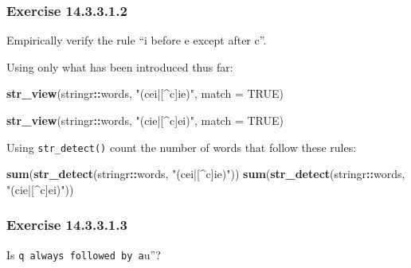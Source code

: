 \documentclass[]{book}
\newenvironment{Shaded}{\begin{snugshade}}{\end{snugshade}}
\newcommand{\DataTypeTok}[1]{\textcolor[rgb]{0.13,0.29,0.53}{#1}}
\newcommand{\KeywordTok}[1]{\textcolor[rgb]{0.13,0.29,0.53}{\textbf{#1}}}
\newcommand{\NormalTok}[1]{#1}
\newcommand{\OperatorTok}[1]{\textcolor[rgb]{0.81,0.36,0.00}{\textbf{#1}}}
\newcommand{\OtherTok}[1]{\textcolor[rgb]{0.56,0.35,0.01}{#1}}
\newcommand{\StringTok}[1]{\textcolor[rgb]{0.31,0.60,0.02}{#1}}
\theoremstyle{plain}
\theoremstyle{remark}
\begin{document}
\hypertarget{exercise-14.3.3.1.2}{%
\subsubsection*{\texorpdfstring{Exercise
{14.3.3.1.2}}{Exercise 14.3.3.1.2}}\label{exercise-14.3.3.1.2}}

Empirically verify the rule ``i before e except after c''.

Using only what has been introduced thus far:

\begin{Shaded}
\begin{Highlighting}[]
\KeywordTok{str_view}\NormalTok{(stringr}\OperatorTok{::}\NormalTok{words, }\StringTok{"(cei|[^c]ie)"}\NormalTok{, }\DataTypeTok{match =} \OtherTok{TRUE}\NormalTok{)}
\end{Highlighting}
\end{Shaded}

\begin{Shaded}
\begin{Highlighting}[]
\KeywordTok{str_view}\NormalTok{(stringr}\OperatorTok{::}\NormalTok{words, }\StringTok{"(cie|[^c]ei)"}\NormalTok{, }\DataTypeTok{match =} \OtherTok{TRUE}\NormalTok{)}
\end{Highlighting}
\end{Shaded}

Using \texttt{str\_detect()} count the number of words that follow these
rules:

\begin{Shaded}
\begin{Highlighting}[]
\KeywordTok{sum}\NormalTok{(}\KeywordTok{str_detect}\NormalTok{(stringr}\OperatorTok{::}\NormalTok{words, }\StringTok{"(cei|[^c]ie)"}\NormalTok{))}
\KeywordTok{sum}\NormalTok{(}\KeywordTok{str_detect}\NormalTok{(stringr}\OperatorTok{::}\NormalTok{words, }\StringTok{"(cie|[^c]ei)"}\NormalTok{))}
\end{Highlighting}
\end{Shaded}

\hypertarget{exercise-14.3.3.1.3}{%
\subsubsection*{\texorpdfstring{Exercise
{14.3.3.1.3}}{Exercise 14.3.3.1.3}}\label{exercise-14.3.3.1.3}}

Is
\texttt{q\textquotesingle{}\textquotesingle{}\ always\ followed\ by\ a}u''?
\end{document}
